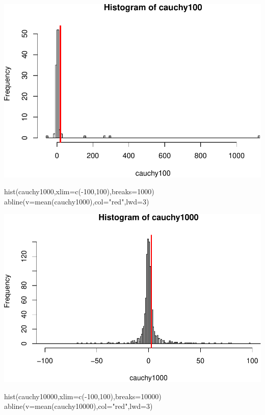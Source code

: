 \documentclass[
]{article}
\newenvironment{Shaded}{\begin{snugshade}}{\end{snugshade}}
\newcommand{\AttributeTok}[1]{\textcolor[rgb]{0.77,0.63,0.00}{#1}}
\newcommand{\DecValTok}[1]{\textcolor[rgb]{0.00,0.00,0.81}{#1}}
\newcommand{\FunctionTok}[1]{\textcolor[rgb]{0.00,0.00,0.00}{#1}}
\newcommand{\NormalTok}[1]{#1}
\newcommand{\SpecialCharTok}[1]{\textcolor[rgb]{0.00,0.00,0.00}{#1}}
\newcommand{\StringTok}[1]{\textcolor[rgb]{0.31,0.60,0.02}{#1}}
\begin{document}
\includegraphics{tp2_files/figure-latex/unnamed-chunk-9-2.pdf}

\begin{Shaded}
\begin{Highlighting}[]
\FunctionTok{hist}\NormalTok{(cauchy1000,}\AttributeTok{xlim=}\FunctionTok{c}\NormalTok{(}\SpecialCharTok{{-}}\DecValTok{100}\NormalTok{,}\DecValTok{100}\NormalTok{),}\AttributeTok{breaks=}\DecValTok{1000}\NormalTok{)}
\FunctionTok{abline}\NormalTok{(}\AttributeTok{v=}\FunctionTok{mean}\NormalTok{(cauchy1000),}\AttributeTok{col=}\StringTok{"red"}\NormalTok{,}\AttributeTok{lwd=}\DecValTok{3}\NormalTok{)}
\end{Highlighting}
\end{Shaded}

\includegraphics{tp2_files/figure-latex/unnamed-chunk-9-3.pdf}

\begin{Shaded}
\begin{Highlighting}[]
\FunctionTok{hist}\NormalTok{(cauchy10000,}\AttributeTok{xlim=}\FunctionTok{c}\NormalTok{(}\SpecialCharTok{{-}}\DecValTok{100}\NormalTok{,}\DecValTok{100}\NormalTok{),}\AttributeTok{breaks=}\DecValTok{10000}\NormalTok{)}
\FunctionTok{abline}\NormalTok{(}\AttributeTok{v=}\FunctionTok{mean}\NormalTok{(cauchy10000),}\AttributeTok{col=}\StringTok{"red"}\NormalTok{,}\AttributeTok{lwd=}\DecValTok{3}\NormalTok{)}
\end{Highlighting}
\end{Shaded}
\end{document}
